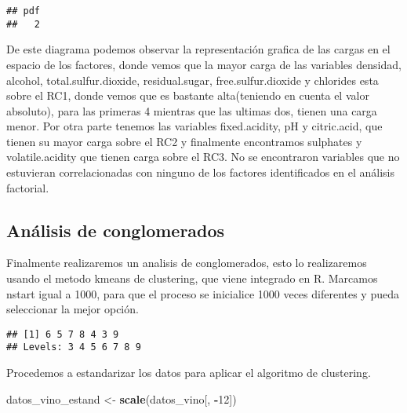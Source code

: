 \documentclass[
]{article}
\newenvironment{Shaded}{\begin{snugshade}}{\end{snugshade}}
\newcommand{\DecValTok}[1]{\textcolor[rgb]{0.00,0.00,0.81}{#1}}
\newcommand{\FunctionTok}[1]{\textcolor[rgb]{0.13,0.29,0.53}{\textbf{#1}}}
\newcommand{\NormalTok}[1]{#1}
\newcommand{\OtherTok}[1]{\textcolor[rgb]{0.56,0.35,0.01}{#1}}
\newcommand{\SpecialCharTok}[1]{\textcolor[rgb]{0.81,0.36,0.00}{\textbf{#1}}}
\begin{document}
\begin{verbatim}
## pdf 
##   2
\end{verbatim}

De este diagrama podemos observar la representación grafica de las
cargas en el espacio de los factores, donde vemos que la mayor carga de
las variables densidad, alcohol, total.sulfur.dioxide, residual.sugar,
free.sulfur.dioxide y chlorides esta sobre el RC1, donde vemos que es
bastante alta(teniendo en cuenta el valor absoluto), para las primeras 4
mientras que las ultimas dos, tienen una carga menor. Por otra parte
tenemos las variables fixed.acidity, pH y citric.acid, que tienen su
mayor carga sobre el RC2 y finalmente encontramos sulphates y
volatile.acidity que tienen carga sobre el RC3. No se encontraron
variables que no estuvieran correlacionadas con ninguno de los factores
identificados en el análisis factorial.

\hypertarget{anuxe1lisis-de-conglomerados}{%
\subsection{Análisis de
conglomerados}\label{anuxe1lisis-de-conglomerados}}

Finalmente realizaremos un analisis de conglomerados, esto lo
realizaremos usando el metodo kmeans de clustering, que viene integrado
en R. Marcamos nstart igual a 1000, para que el proceso se inicialice
1000 veces diferentes y pueda seleccionar la mejor opción.

\begin{Shaded}
\end{Shaded}

\begin{verbatim}
## [1] 6 5 7 8 4 3 9
## Levels: 3 4 5 6 7 8 9
\end{verbatim}

Procedemos a estandarizar los datos para aplicar el algoritmo de
clustering.

\begin{Shaded}
\begin{Highlighting}[]
\NormalTok{datos\_vino\_estand }\OtherTok{\textless{}{-}} \FunctionTok{scale}\NormalTok{(datos\_vino[, }\SpecialCharTok{{-}}\DecValTok{12}\NormalTok{])}
\end{Highlighting}
\end{Shaded}
\end{document}
